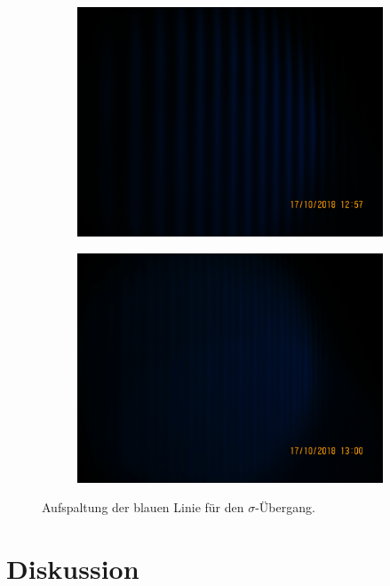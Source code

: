 \begin{figure}
 \begin{subfigure}[c]{0.5\textwidth}
   \includegraphics[width=\textwidth]{Bild4.JPG}
 \end{subfigure}
 \begin{subfigure}[c]{0.5\textwidth}
   \includegraphics[width=\textwidth]{Bild6.JPG}
 \end{subfigure}
 \caption{Aufspaltung der blauen Linie für den $\sigma$-Übergang.}
\end{figure}

\section{Diskussion}


